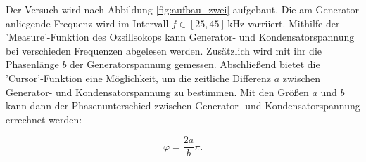 Der Versuch wird nach Abbildung \ref{fig:aufbau_zwei} aufgebaut.
Die am Generator anliegende Frequenz wird im Intervall $f\in\left[25,45\right]\,\si{\kilo\hertz}$
varriiert. Mithilfe der 'Measure'-Funktion des Ozsillsokops %
kann Generator- und Kondensatorspannung bei verschieden Frequenzen %
abgelesen werden. Zusätzlich wird mit ihr die Phasenlänge $b$ der Generatorspannung
gemessen. Abschließend bietet die 'Cursor'-Funktion eine Möglichkeit, um %
die zeitliche Differenz $a$ zwischen Generator- und Kondensatorspannung zu
bestimmen.
Mit den Größen $a$ und $b$ kann dann der Phasenunterschied zwischen
Generator- und Kondensatorspannung errechnet werden:

\begin{equation}
  \label{eq:phasen_unterschied}
  \varphi=\frac{2a}{b}\pi.
\end{equation}
